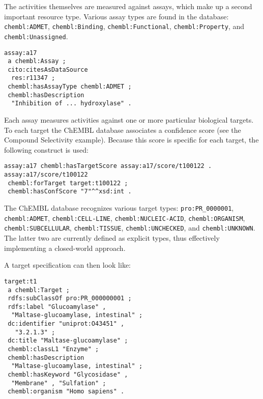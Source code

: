 \documentclass[10pt]{bmc_article}
\newenvironment{bmcformat}{\begin{raggedright}\baselineskip20pt\sloppy\setboolean{publ}{false}}{\end{raggedright}\baselineskip20pt\sloppy}
\begin{document}
\begin{bmcformat}
The activities themselves are measured against assays, which make up a second important
resource type. Various assay types are found in the database: \verb+chembl:ADMET+, \verb+chembl:Binding+,
\verb+chembl:Functional+, \verb+chembl:Property+, and \verb+chembl:Unassigned+.

\begin{small}
\begin{verbatim}
assay:a17
 a chembl:Assay ;
 cito:citesAsDataSource
  res:r11347 ;
 chembl:hasAssayType chembl:ADMET ;
 chembl:hasDescription
  "Inhibition of ... hydroxylase" .
\end{verbatim}
\end{small}

Each assay measures activities against one or more particular biological targets. To each
target the ChEMBL database associates a confidence score (see the Compound Selectivity
example). Because this score is specific
for each target, the following construct is used:

\begin{small}
\begin{verbatim}
assay:a17 chembl:hasTargetScore assay:a17/score/t100122 .
assay:a17/score/t100122
 chembl:forTarget target:t100122 ;
 chembl:hasConfScore "7"^^xsd:int .  
\end{verbatim}
\end{small}

The ChEMBL database
recognizes various target types: \verb+pro:PR_0000001+, \verb+chembl:ADMET+, \verb+chembl:CELL-LINE+,
\verb+chembl:NUCLEIC-ACID+, \verb+chembl:ORGANISM+, \verb+chembl:SUBCELLULAR+, \verb+chembl:TISSUE+,
\verb+chembl:UNCHECKED+, and \verb+chembl:UNKNOWN+. The latter two are currently defined as
explicit types, thus effectively implementing a closed-world approach. 

A target specification can then look like:

\begin{small}
\begin{verbatim}
target:t1
 a chembl:Target ;
 rdfs:subClassOf pro:PR_000000001 ;
 rdfs:label "Glucoamylase" , 
  "Maltase-glucoamylase, intestinal" ;
 dc:identifier "uniprot:O43451" ,
   "3.2.1.3" ;
 dc:title "Maltase-glucoamylase" ;
 chembl:classL1 "Enzyme" ;
 chembl:hasDescription
  "Maltase-glucoamylase, intestinal" ;
 chembl:hasKeyword "Glycosidase" , 
  "Membrane" , "Sulfation" ;
 chembl:organism "Homo sapiens" .
\end{verbatim}
\end{small}


\end{bmcformat}
\end{document}
